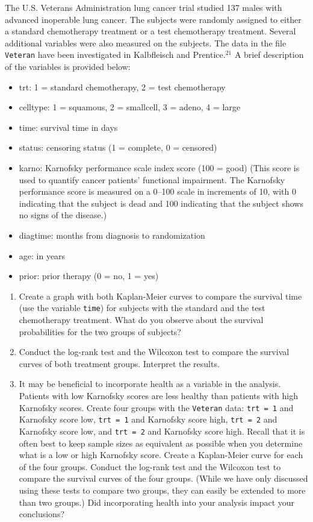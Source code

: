 \documentclass[
]{report}
\begin{document}
\begin{enumerate}
The U.S. Veterans Administration lung cancer trial studied 137 males with advanced inoperable lung cancer. The subjects were randomly assigned to either a standard chemotherapy treatment or a test chemotherapy treatment. Several additional variables were also measured on the subjects. The data in the file \texttt{Veteran} have been investigated in Kalbfleisch and Prentice.$^{21}$ A brief description of the variables is provided below:
\begin{itemize}
  \item trt: 1 = standard chemotherapy, 2 = test chemotherapy
  \item celltype: 1 = squamous, 2 = smallcell, 3 = adeno, 4 = large
  \item time: survival time in days
  \item status: censoring status (1 = complete, 0 = censored)
  \item karno: Karnofsky performance scale index score (100 = good) (This score is used to quantify cancer patients’ functional impairment. The Karnofsky performance score is measured on a 0–100 scale in increments of 10, with 0 indicating that the subject is dead and 100 indicating that the subject shows no signs of the disease.)
  \item diagtime: months from diagnosis to randomization
  \item age: in years
  \item prior: prior therapy (0 = no, 1 = yes)
\end{itemize}
  \begin{enumerate}
    \item Create a graph with both Kaplan-Meier curves to compare the survival time (use the variable \texttt{time}) for subjects with the standard and the test chemotherapy treatment. What do you observe about the survival probabilities for the two groups of subjects?
    \item Conduct the log-rank test and the Wilcoxon test to compare the survival curves of both treatment groups. Interpret the results.
    \item It may be beneficial to incorporate health as a variable in the analysis. Patients with low Karnofsky scores are less healthy than patients with high Karnofsky scores. Create four groups with the \texttt{Veteran} data: \texttt{trt = 1} and Karnofsky score low, \texttt{trt = 1} and Karnofsky score high, \texttt{trt = 2} and Karnofsky score low, and \texttt{trt = 2} and Karnofsky score high. Recall that it is often best to keep sample sizes as equivalent as possible when you determine what is a low or high Karnofsky score. Create a Kaplan-Meier curve for each of the four groups. Conduct the log-rank test and the Wilcoxon test to compare the survival curves of the four groups. (While we have only discussed using these tests to compare two groups, they can easily be extended to more than two groups.) Did incorporating health into your analysis impact your conclusions?
  \end{enumerate}


\end{enumerate}
\end{document}
